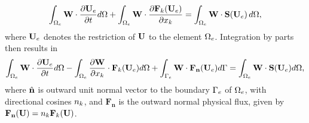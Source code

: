 \begin{equation*}
\int_{\Omega_e} \mathbf{W} \cdot \frac{\partial \mathbf{U}_e}{\partial t} d\Omega  + \int_{\Omega_e} \mathbf{W} \cdot \frac{\partial \mathbf{F}_{k}(\mathbf{U}_e)}{\partial x_k}= \int_{\Omega_e} \mathbf{W} \cdot \mathbf{S}(\mathbf{U}_e) \, d\Omega,
\end{equation*}
where $\mathbf{U}_e$ denotes the restriction of $\mathbf{U}$ to the element $\Omega_e$. Integration by parts then results in
\begin{equation}
\int_{\Omega_e} \mathbf{W} \cdot \frac{\partial \mathbf{U}_e}{\partial t} d\Omega  - \int_{\Omega_e} \frac{\partial \mathbf{W}}{\partial x_k} \cdot
\mathbf{F}_{k}(\mathbf{U}_e) d\Omega + \int_{\Gamma_e} \mathbf{W} \cdot \mathbf{\mathbf{F}_n}(\mathbf{U}_e) d\Gamma
= \int_{\Omega_e} \mathbf{W} \cdot \mathbf{S}(\mathbf{U}_e) d\Omega,
\label{eq:weak-form-with-physical-flux}
\end{equation}
where $\hat{\mathbf{n}}$ is outward unit normal vector to the boundary $\Gamma_e$ of $\Omega_e$, with directional cosines $n_{k}$, and $\mathbf{F_n}$ is the outward normal physical flux, given by $ \mathbf{F_n}(\mathbf{U}) = n_{k} \mathbf{F}_k(\mathbf{U}) $.

